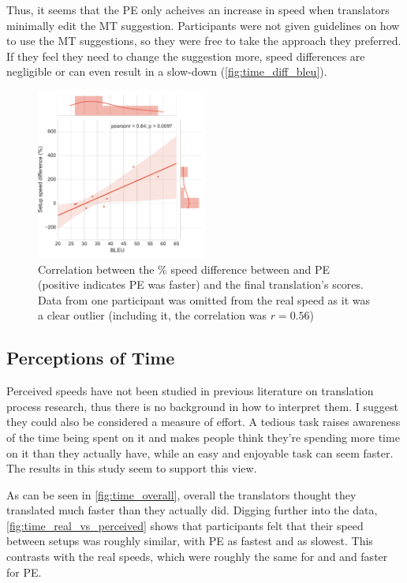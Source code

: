 Thus, it seems that the \ac{PE} only acheives an increase in speed when translators minimally edit the \ac{MT} suggestion. Participants were not given guidelines on how to use the \ac{MT} suggestions, so they were free to take the approach they preferred. If they feel they need to change the suggestion more, speed differences are negligible or can even result in a slow-down (\autoref{fig:time_diff_bleu}).

\begin{figure}[H]
\myfloatalign
\includegraphics[width=0.5\textwidth]{img/time/time_diff_bleu}
\caption{Correlation between the \% speed difference between \scratch and \ac{PE} (positive indicates \ac{PE} was faster) and the final translation's  scores. Data from one participant was omitted from the real speed as it was a clear outlier (including it, the correlation was $r = 0.56$)}
\label{fig:time_diff_bleu}
\end{figure}

\subsection{Perceptions of Time}

\noindent Perceived speeds have not been studied in previous literature on translation process research, thus there is no background in how to interpret them. I suggest they could also be considered a measure of effort. A tedious task raises awareness of the time being spent on it and makes people think they're spending more time on it than they actually have, while an easy and enjoyable task can seem faster. The results in this study seem to support this view. 

As can be seen in \autoref{fig:time_overall}, overall the translators thought they translated much faster than they actually did. Digging further into the data, \autoref{fig:time_real_vs_perceived} shows that participants felt that their speed between setups was roughly similar, with \ac{PE} as fastest and \style as slowest. This contrasts with the real speeds, which were roughly the same for \style and \scratch and faster for \ac{PE}.

